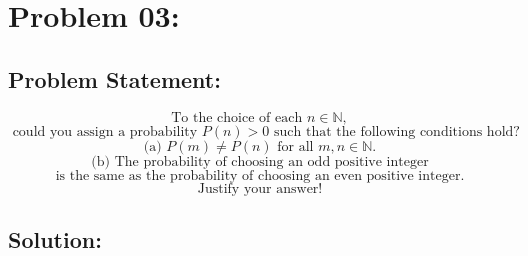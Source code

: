 \documentclass{article}
\theoremstyle{definition}
\begin{document}
\section{Problem 03:}


\begin{mdframed}[style = MyFrame]

\subsection{Problem Statement:}
\[
    \text{To the choice of each } n \in \mathbb{N}, \]\[\text{ could you assign a probability } P(n) > 0 \text{ such that the following conditions hold?} \]
    \[
\text{(a) } P(m) \neq P(n) \text{ for all } m, n \in \mathbb{N}. 
\]
\[
\text{(b) The probability of choosing an odd positive integer}\]
\[
\text{is the same as the probability of choosing an even positive integer.} \]
\[
\text{Justify your answer!}
\]
\end{mdframed}
\subsection{Solution:}
\end{document}
